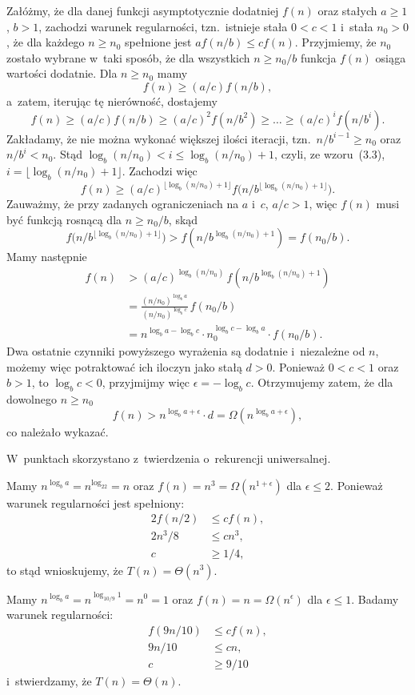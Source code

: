 \noindent Załóżmy, że dla danej funkcji asymptotycznie dodatniej $f(n)$ oraz stałych $a\ge1$, $b>1$, zachodzi warunek regularności, tzn.\ istnieje stała $0<c<1$ i~stała $n_0>0$, że dla każdego $n\ge n_0$ spełnione jest $af(n/b)\le cf(n)$. Przyjmiemy, że $n_0$ zostało wybrane w~taki sposób, że dla wszystkich $n\ge n_0/b$ funkcja $f(n)$ osiąga wartości dodatnie. Dla $n\ge n_0$ mamy
\[
	f(n) \ge (a/c)f(n/b),
\]
a~zatem, iterując tę nierówność, dostajemy
\[
	f(n) \ge (a/c)f(n/b) \ge (a/c)^2f(n/b^2) \ge \dots \ge (a/c)^if(n/b^i).
\]
Zakładamy, że nie można wykonać większej ilości iteracji, tzn.\ $n/b^{i-1}\ge n_0$ oraz $n/b^i<n_0$. Stąd $\log_b(n/n_0)<i\le\log_b(n/n_0)+1$, czyli, ze wzoru~(3.3), $i=\lfloor\log_b(n/n_0)+1\rfloor$. Zachodzi więc
\[
	f(n) \ge (a/c)^{\lfloor\log_b(n/n_0)+1\rfloor}f\bigl(n/b^{\lfloor\log_b(n/n_0)+1\rfloor}\bigr).
\]
Zauważmy, że przy zadanych ograniczeniach na $a$ i~$c$, $a/c>1$, więc $f(n)$ musi być funkcją rosnącą dla $n\ge n_0/b$, skąd
\[
	f\bigl(n/b^{\lfloor\log_b(n/n_0)+1\rfloor}\bigr) > f(n/b^{\log_b(n/n_0)+1}) = f(n_0/b).
\]
Mamy następnie
\begin{align*}
	f(n) &> (a/c)^{\log_b(n/n_0)}\,f(n/b^{\log_b(n/n_0)+1}) \\[1mm]
	&= \frac{(n/n_0)^{\log_ba}}{(n/n_0)^{\log_bc}}\,f(n_0/b) \\[1mm]
	&= n^{\log_ba-\log_bc}\cdot n_0^{\log_bc-\log_ba}\cdot f(n_0/b).
\end{align*}
Dwa ostatnie czynniki powyższego wyrażenia są dodatnie i~niezależne od $n$, możemy więc potraktować ich iloczyn jako stałą $d>0$. Ponieważ $0<c<1$ oraz $b>1$, to $\log_bc<0$, przyjmijmy więc $\epsilon=-\log_bc$. Otrzymujemy zatem, że dla dowolnego $n\ge n_0$
\[
	f(n) > n^{\log_ba+\epsilon}\cdot d = \Omega(n^{\log_ba+\epsilon}),
\]
co należało wykazać.

\problems

W~punktach  skorzystano z~twierdzenia o~rekurencji uniwersalnej.

\subproblem %
Mamy $n^{\log_ba}=n^{\log_22}=n$ oraz $f(n)=n^3=\Omega(n^{1+\epsilon})$ dla $\epsilon\le2$. Ponieważ warunek regularności jest spełniony:
\begin{align*}
	2f(n/2) &\le cf(n), \\
	2n^3\!/8 &\le cn^3, \\
	c &\ge 1/4,
\end{align*}
to stąd wnioskujemy, że $T(n)=\Theta(n^3)$.

\subproblem %
Mamy $n^{\log_ba}=n^{\log_{10/9}1}=n^0=1$ oraz $f(n)=n=\Omega(n^\epsilon)$ dla $\epsilon\le1$. Badamy warunek regularności:
\begin{align*}
	f(9n/10) &\le cf(n), \\
	9n/10 &\le cn, \\
	c &\ge 9/10
\end{align*}
i~stwierdzamy, że $T(n)=\Theta(n)$.

